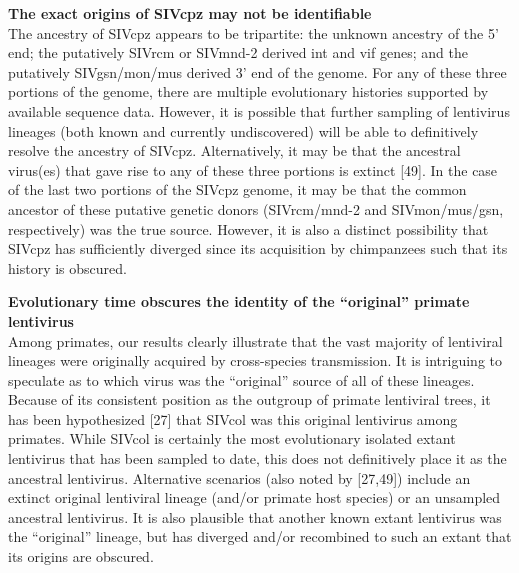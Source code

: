 \textbf{The exact origins of SIVcpz may not be identifiable}\\
The ancestry of SIVcpz appears to be tripartite: the unknown ancestry of the 5’ end; the putatively SIVrcm or SIVmnd-2 derived int and vif genes; and the putatively SIVgsn/mon/mus derived 3’ end of the genome.
For any of these three portions of the genome, there are multiple evolutionary histories supported by available sequence data.
However, it is possible that further sampling of lentivirus lineages (both known and currently undiscovered) will be able to definitively resolve the ancestry of SIVcpz.
Alternatively, it may be that the ancestral virus(es) that gave rise to any of these three portions is extinct [49].
In the case of the last two portions of the SIVcpz genome, it may be that the common ancestor of these putative genetic donors (SIVrcm/mnd-2 and SIVmon/mus/gsn, respectively) was the true source.
However, it is also a distinct possibility that SIVcpz has sufficiently diverged since its acquisition by chimpanzees such that its history is obscured.

\textbf{Evolutionary time obscures the identity of the “original” primate lentivirus}\\
Among primates, our results clearly illustrate that the vast majority of lentiviral lineages were originally acquired by cross-species transmission.
It is intriguing to speculate as to which virus was the “original” source of all of these lineages.
Because of its consistent position as the outgroup of primate lentiviral trees, it has been hypothesized [27] that SIVcol was this original lentivirus among primates.
While SIVcol is certainly the most evolutionary isolated extant lentivirus that has been sampled to date, this does not definitively place it as the ancestral lentivirus.
Alternative scenarios (also noted by [27,49]) include an extinct original lentiviral lineage (and/or primate host species) or an unsampled ancestral lentivirus.
It is also plausible that another known extant lentivirus was the “original” lineage, but has diverged and/or recombined to such an extant that its origins are obscured.

